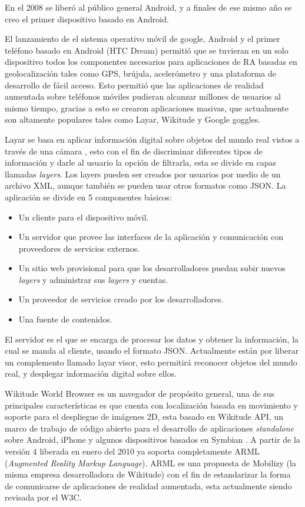 \documentclass[12pt,a4paper,spanish,openany]{book}
\begin{document}
En el 2008 se liberó al público general Android, y a finales de ese mismo año
se creo el primer dispositivo basado en Android.

El lanzamiento de el sistema operativo móvil de google, Android y el primer
teléfono basado en Android (HTC Dream) permitió que se tuvieran en un solo
dispositivo todos los componentes necesarios para aplicaciones
de RA basadas en geolocalización tales como GPS, brújula, acelerómetro y una
plataforma de desarrollo de fácil acceso\cite{citeulike:6844215}. Esto permitió
que las aplicaciones de realidad aumentada sobre teléfonos móviles pudieran
alcanzar millones de usuarios al mismo tiempo, gracias a esto se crearon
aplicaciones masivas, que actualmente son altamente populares tales como Layar,
Wikitude y Google goggles.


Layar se basa en aplicar información digital sobre objetos del mundo real
vistos a través de una cámara \cite{Eishita:2010:TSA:1920778.1920811}, esto con
el fin de discriminar diferentes tipos de información y darle al usuario la opción
de filtrarla, esta se divide en
capas llamadas \emph{layers}. Los layers pueden ser creados por usuarios por
medio de un archivo XML, aunque también se pueden usar otros formatos como
JSON. La aplicación se divide en 5 componentes básicos: 
\begin{itemize}
  \item Un cliente para el dispositivo móvil.
  \item Un servidor que provee las interfaces de la aplicación y comunicación
  con proveedores de servicios externos.
  \item Un sitio web provisional para que los desarrolladores puedan subir
  nuevos \emph{layers} y administrar sus \emph{layers} y cuentas.
  \item  Un proveedor de servicios creado por los desarrolladores.
  \item Una fuente de contenidos.
\end{itemize}
El servidor es el que se encarga de
procesar los datos y obtener la información, la cual se manda al cliente, usando
el formato JSON. Actualmente están por liberar un complemento llamado layar
visor, esto permitirá reconocer objetos del mundo real, y desplegar información
digital sobre ellos.


Wikitude World Browser es un navegador de propósito general, una de sus
principales características es que cuenta con localización basada en movimiento
y soporte para el despliegue de imágenes 2D, esta basado en Wikitude API, un
marco de trabajo de código abierto para el desarrollo de aplicaciones
\emph{standalone} sobre Android, iPhone y algunos dispositivos basados en
Symbian \cite{madden2011professional}. A partir de la versión 4 liberada en
enero del 2010 ya soporta completamente ARML (\emph{Augmented Reality Markup
Language}). ARML es una propuesta de Mobilizy (la misma empresa desarrolladora de Wikitude) con el fin de estandarizar la
forma de comunicarse de aplicaciones de realidad aumentada, esta actualmente
siendo revisada por el W3C.
\end{document}

